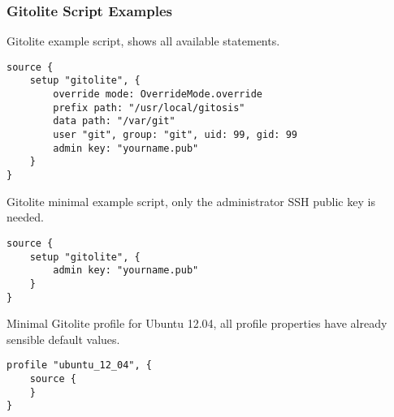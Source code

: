 \subsubsection{Gitolite Script Examples}

Gitolite example script, shows all available statements.

\begin{lstlisting}[style=Java,label=lst:gitolite_example_script, title={Source.groovy}]
source {
    setup "gitolite", {
        override mode: OverrideMode.override
        prefix path: "/usr/local/gitosis"
        data path: "/var/git"
        user "git", group: "git", uid: 99, gid: 99
        admin key: "yourname.pub"
    }
}
\end{lstlisting}

Gitolite minimal example script, only the administrator SSH public key is needed.

\begin{lstlisting}[style=Java,label=lst:gitolite_example_script, title={Source.groovy}]
source {
    setup "gitolite", {
        admin key: "yourname.pub"
    }
}
\end{lstlisting}

Minimal Gitolite profile for Ubuntu 12.04, all profile properties have already sensible default values.

\begin{lstlisting}[style=Java,label=lst:gitolite_ubuntu_profile_min, title={UbuntuProfile.groovy}]
profile "ubuntu_12_04", {
    source {
    }
}
\end{lstlisting}

